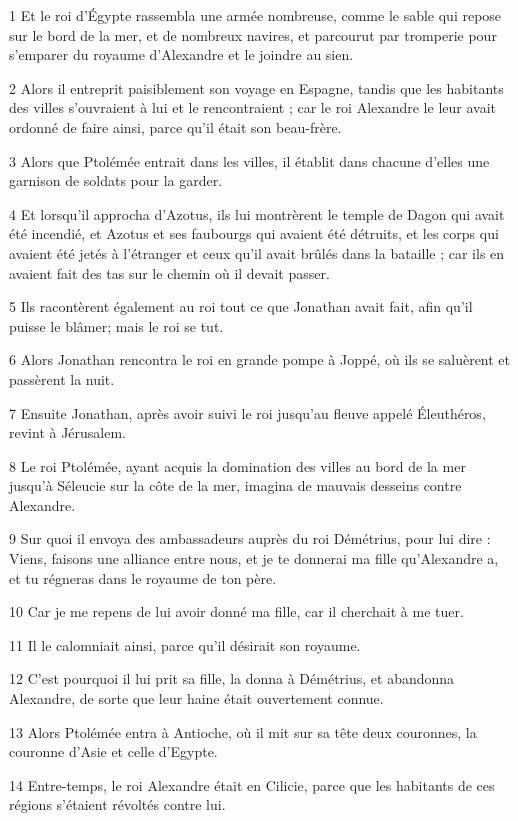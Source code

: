 \par 1 Et le roi d'Égypte rassembla une armée nombreuse, comme le sable qui repose sur le bord de la mer, et de nombreux navires, et parcourut par tromperie pour s'emparer du royaume d'Alexandre et le joindre au sien.
\par 2 Alors il entreprit paisiblement son voyage en Espagne, tandis que les habitants des villes s'ouvraient à lui et le rencontraient ; car le roi Alexandre le leur avait ordonné de faire ainsi, parce qu'il était son beau-frère.
\par 3 Alors que Ptolémée entrait dans les villes, il établit dans chacune d'elles une garnison de soldats pour la garder.
\par 4 Et lorsqu'il approcha d'Azotus, ils lui montrèrent le temple de Dagon qui avait été incendié, et Azotus et ses faubourgs qui avaient été détruits, et les corps qui avaient été jetés à l'étranger et ceux qu'il avait brûlés dans la bataille ; car ils en avaient fait des tas sur le chemin où il devait passer.
\par 5 Ils racontèrent également au roi tout ce que Jonathan avait fait, afin qu'il puisse le blâmer; mais le roi se tut.
\par 6 Alors Jonathan rencontra le roi en grande pompe à Joppé, où ils se saluèrent et passèrent la nuit.
\par 7 Ensuite Jonathan, après avoir suivi le roi jusqu'au fleuve appelé Éleuthéros, revint à Jérusalem.
\par 8 Le roi Ptolémée, ayant acquis la domination des villes au bord de la mer jusqu'à Séleucie sur la côte de la mer, imagina de mauvais desseins contre Alexandre.
\par 9 Sur quoi il envoya des ambassadeurs auprès du roi Démétrius, pour lui dire : Viens, faisons une alliance entre nous, et je te donnerai ma fille qu'Alexandre a, et tu régneras dans le royaume de ton père.
\par 10 Car je me repens de lui avoir donné ma fille, car il cherchait à me tuer.
\par 11 Il le calomniait ainsi, parce qu'il désirait son royaume.
\par 12 C'est pourquoi il lui prit sa fille, la donna à Démétrius, et abandonna Alexandre, de sorte que leur haine était ouvertement connue.
\par 13 Alors Ptolémée entra à Antioche, où il mit sur sa tête deux couronnes, la couronne d'Asie et celle d'Egypte.
\par 14 Entre-temps, le roi Alexandre était en Cilicie, parce que les habitants de ces régions s'étaient révoltés contre lui.
